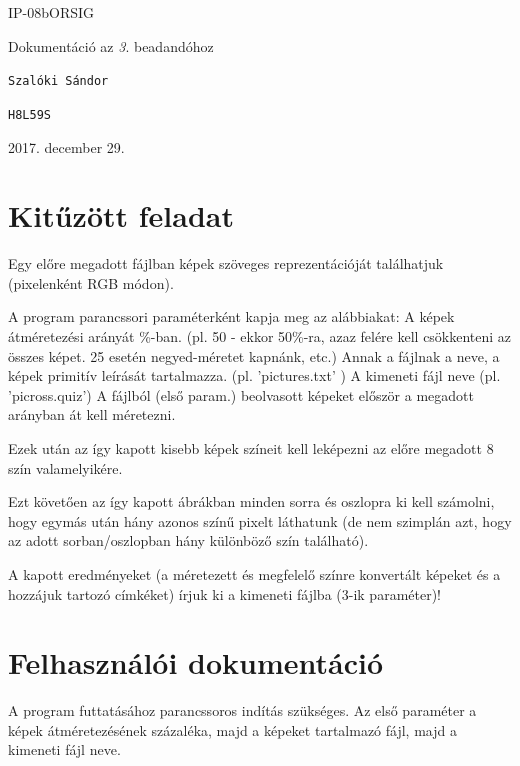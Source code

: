 \documentclass[12pt]{article}
\begin{document}
\begin{titlepage}
	\vspace*{0.5cm}
	{\normalsize IP-08bORSIG}
	
	\vspace{2cm}
	{\huge Dokumentáció az \textit{3}. beadandóhoz}
	
	\vspace*{5cm}
	
	{\large \verb|Szalóki Sándor| } %
	
	{\large \verb|H8L59S| }  %
		
	
	\vfill
	
	\vspace*{1cm}
	2017. december 29. %
\end{titlepage}

\section{Kitűzött feladat}

Egy előre megadott fájlban képek szöveges reprezentációját találhatjuk (pixelenként RGB módon).

A program parancssori paraméterként kapja meg az alábbiakat:
A képek átméretezési arányát \%-ban. (pl. 50 - ekkor 50\%-ra, azaz felére kell csökkenteni az összes képet. 25 esetén negyed-méretet kapnánk, etc.)
Annak a fájlnak a neve, a képek primitív leírását tartalmazza. (pl. 'pictures.txt' )
A kimeneti fájl neve (pl. 'picross.quiz')
A fájlból (első param.) beolvasott képeket először a megadott arányban át kell méretezni.

Ezek után az így kapott kisebb képek színeit kell leképezni az előre megadott 8 szín valamelyikére.

Ezt követően az így kapott ábrákban minden sorra és oszlopra ki kell számolni, hogy egymás után hány azonos színű pixelt láthatunk (de nem szimplán azt, hogy az adott sorban/oszlopban hány különböző szín található).

A kapott eredményeket (a méretezett és megfelelő színre konvertált képeket és a hozzájuk tartozó címkéket) írjuk ki a kimeneti fájlba (3-ik paraméter)!

\section{Felhasználói dokumentáció}

A program futtatásához parancssoros indítás szükséges. Az első paraméter a képek átméretezésének százaléka, majd a képeket tartalmazó fájl, majd a kimeneti fájl neve.
\end{document}
